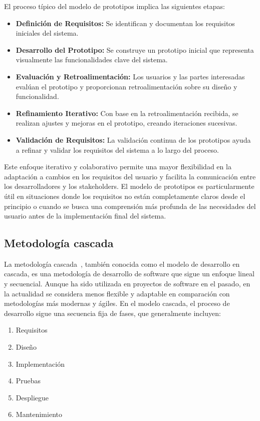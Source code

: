El proceso típico del modelo de prototipos implica las siguientes etapas:
\begin{itemize}
	\item \textbf{Definición de Requisitos:}
Se identifican y documentan los requisitos iniciales del sistema.

\item \textbf{Desarrollo del Prototipo:}
Se construye un prototipo inicial que representa visualmente las funcionalidades clave del sistema.

\item \textbf{Evaluación y Retroalimentación:}
Los usuarios y las partes interesadas evalúan el prototipo y proporcionan retroalimentación sobre su diseño y funcionalidad.

\item \textbf{Refinamiento Iterativo:}
Con base en la retroalimentación recibida, se realizan ajustes y mejoras en el prototipo, creando iteraciones sucesivas.

\item \textbf{Validación de Requisitos:}
La validación continua de los prototipos ayuda a refinar y validar los requisitos del sistema a lo largo del proceso.
\end{itemize}

Este enfoque iterativo y colaborativo permite una mayor flexibilidad en la adaptación a cambios en los requisitos del usuario y facilita la comunicación entre los desarrolladores y los stakeholders. El modelo de prototipos es particularmente útil en situaciones donde los requisitos no están completamente claros desde el principio o cuando se busca una comprensión más profunda de las necesidades del usuario antes de la implementación final del sistema.

\subsection{Metodología cascada}
La metodología cascada~\cite{misc:Metodologia_Cascada}, también conocida como el modelo de desarrollo en cascada, es una metodología de desarrollo de software que sigue un enfoque lineal y secuencial. Aunque ha sido utilizada en proyectos de software en el pasado, en la actualidad se considera menos flexible y adaptable en comparación con metodologías más modernas y ágiles.
En el modelo cascada, el proceso de desarrollo sigue una secuencia fija de fases, que generalmente incluyen:

\begin{enumerate}
\item Requisitos
\item Diseño
\item Implementación
\item Pruebas
\item Despliegue
\item Mantenimiento
\end{enumerate}

